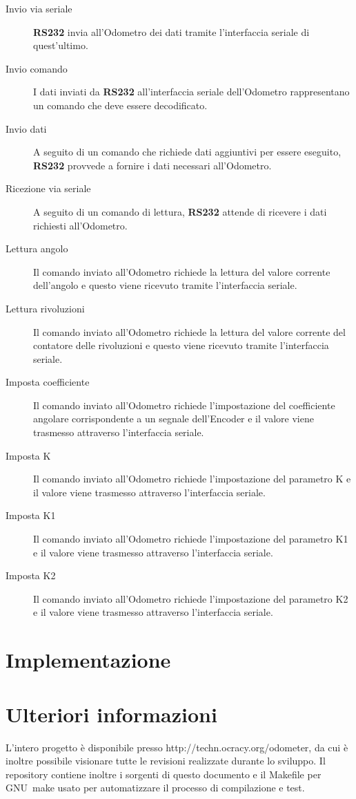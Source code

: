 \documentclass [11pt,a4paper,oneside]{article}
\newcommand{\href}[2]{#2}
\newcommand{\link}[1]{\href{#1}{#1}}
\begin{document}
\begin{description}
\item[Invio via seriale] \textbf{RS232} invia all'Odometro dei dati tramite l'interfaccia
     seriale di quest'ultimo.
\item[Invio comando] I dati inviati da \textbf{RS232} all'interfaccia seriale dell'Odometro
     rappresentano un comando che deve essere decodificato.
\item[Invio dati] A seguito di un comando che richiede dati aggiuntivi per essere
     eseguito, \textbf{RS232} provvede a fornire i dati necessari all'Odometro.
\item[Ricezione via seriale] A seguito di un comando di lettura, \textbf{RS232} attende di
     ricevere i dati richiesti all'Odometro.
\item[Lettura angolo] Il comando inviato all'Odometro richiede la lettura del
     valore corrente dell'angolo e questo viene ricevuto tramite l'interfaccia
     seriale.
\item[Lettura rivoluzioni] Il comando inviato all'Odometro richiede la lettura del
     valore corrente del contatore delle rivoluzioni e questo viene ricevuto
     tramite l'interfaccia seriale.
\item[Imposta coefficiente] Il comando inviato all'Odometro richiede l'impostazione
     del coefficiente angolare corrispondente a un segnale dell'Encoder e il valore
     viene trasmesso attraverso l'interfaccia seriale.
\item[Imposta K] Il comando inviato all'Odometro richiede l'impostazione del
     parametro K e il valore viene trasmesso attraverso l'interfaccia seriale.
\item[Imposta K1] Il comando inviato all'Odometro richiede l'impostazione del
     parametro K1 e il valore viene trasmesso attraverso l'interfaccia seriale.
\item[Imposta K2] Il comando inviato all'Odometro richiede l'impostazione del
     parametro K2 e il valore viene trasmesso attraverso l'interfaccia seriale.
\end{description}


\section{Implementazione}


\section{Ulteriori informazioni}
L'intero progetto è disponibile presso \link{http://techn.ocracy.org/odometer}, da cui
è inoltre possibile visionare tutte le revisioni realizzate durante lo sviluppo.
Il repository contiene inoltre i sorgenti di questo documento e il Makefile
per GNU~make usato per automatizzare il processo di compilazione e test.
\end{document}
